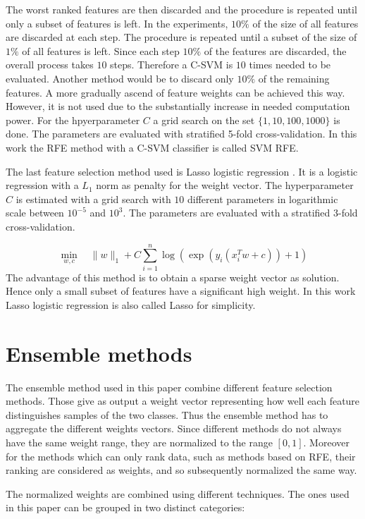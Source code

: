\documentclass[twoside,11pt]{article}
\begin{document}
The worst ranked features are then discarded and the procedure is repeated until only a subset of features is left. In the experiments, $10\%$ of the size of all features are discarded at each step. The procedure is repeated until a subset of the size of $1\%$ of all features is left. Since each step $10\%$ of the features are discarded, the overall process takes $10$ steps. Therefore a C-SVM is $10$ times needed to be evaluated. Another method would be to discard only $10\%$ of the remaining features. A more gradually ascend of feature weights can be achieved this way. However, it is not used due to the substantially increase in needed computation power. For the hpyerparameter $C$ a grid search on the set $\{1, 10, 100, 1000\}$ is done. The parameters are evaluated with stratified 5-fold cross-validation. In this work the RFE method with a C-SVM classifier is called SVM RFE.

The last feature selection method used is Lasso logistic regression \citep{wheeler2010lasso}. It is a logistic regression with a $L_1$ norm as penalty for the weight vector. The hyperparameter $C$ is estimated with a grid search with $10$ different parameters in logarithmic scale between $10^{-5}$ and $10^3$. The parameters are evaluated with a stratified 3-fold cross-validation.

\begin{equation}
    \min_{w,c} \quad \|w\|_1 + C\sum_{i=1}^n \log(\exp(y_i(x_i^Tw + c))+1)
  \end{equation}
  The advantage of this method is to obtain a sparse weight vector as solution. Hence only a small subset of features have a significant high weight. In this work Lasso logistic regression is also called Lasso for simplicity.
  
\section{Ensemble methods}
 The ensemble method used in this paper combine different feature selection methods. Those give as output a weight vector representing how well each feature distinguishes samples of the two classes. Thus the ensemble method has to aggregate the different weights vectors. Since different methods do not always have the same weight range, they are normalized to the range $[0,1]$. Moreover for the methods which can only rank data, such as methods based on RFE, their ranking are considered as weights, and so subsequently normalized the same way. 
 
 The normalized weights are combined using different techniques. The ones used in this paper can be grouped in two distinct categories: 
\end{document}
